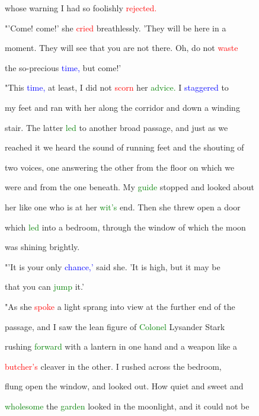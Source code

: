  whose \textcolor{BurntOrange}{warning} I had so foolishly \textcolor{red}{rejected.}



 "'Come! come!' she \textcolor{red}{cried} breathlessly. 'They will be here in a

 moment. They will see that you are not there. Oh, do not \textcolor{red}{waste}

 the so-precious \textcolor{blue}{time,} but come!'



 "This \textcolor{blue}{time,} at least, I did not \textcolor{red}{scorn} her \textcolor{green}{advice.} I \textcolor{blue}{staggered} to

 my feet and ran with her along the corridor and down a winding

 stair. The latter \textcolor{green}{led} to another broad passage, and just as we

 reached it we heard the sound of running feet and the \textcolor{BurntOrange}{shouting} of

 two voices, one answering the other from the floor on which we

 were and from the one beneath. My \textcolor{green}{guide} stopped and looked about

 her like one who is at her \textcolor{green}{wit's} end. Then she threw open a door

 which \textcolor{green}{led} into a bedroom, through the window of which the moon

 was shining brightly.



 "'It is your only \textcolor{blue}{chance,'} said she. 'It is high, but it may be

 that you can \textcolor{green}{jump} it.'



 "As she \textcolor{red}{spoke} a light sprang into view at the further end of the

 passage, and I saw the lean figure of \textcolor{green}{Colonel} Lysander \textcolor{BurntOrange}{Stark}

 rushing \textcolor{green}{forward} with a lantern in one hand and a weapon like a

 \textcolor{red}{butcher's} cleaver in the other. I rushed across the bedroom,

 flung open the window, and looked out. How \textcolor{BurntOrange}{quiet} and \textcolor{BurntOrange}{sweet} and

 \textcolor{green}{wholesome} the \textcolor{green}{garden} looked in the moonlight, and it could not be

